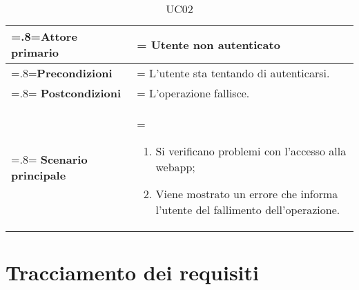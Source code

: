                     \begin{table}[H]
                    \centering
                    \renewcommand{\arraystretch}{1.8}
                    \renewcommand\tabularxcolumn[1]{m{#1}}
                    \begin{tabularx}{0.9\textwidth} {
                        >{\hsize=.8\hsize\linewidth=\hsize}X
                        >{\hsize=1.2\hsize\linewidth=\hsize}X}
                        \hline
                        \textbf{Attore primario} & Utente non autenticato \\
                        \hline
                        \textbf{Precondizioni} & L'utente sta tentando di autenticarsi. \\
                        \hline
                        \textbf{Postcondizioni} & L'operazione fallisce. \\
                        \hline
                        \textbf{Scenario principale} &
                            \begin{enumerate}
                                \item Si verificano problemi con l'accesso alla webapp;
                                \item Viene mostrato un errore che informa l'utente del fallimento dell'operazione.
                            \end{enumerate} \\
                        \hline
                    \end{tabularx}
                    \caption{UC02}
                \end{table}

\section{Tracciamento dei requisiti}

